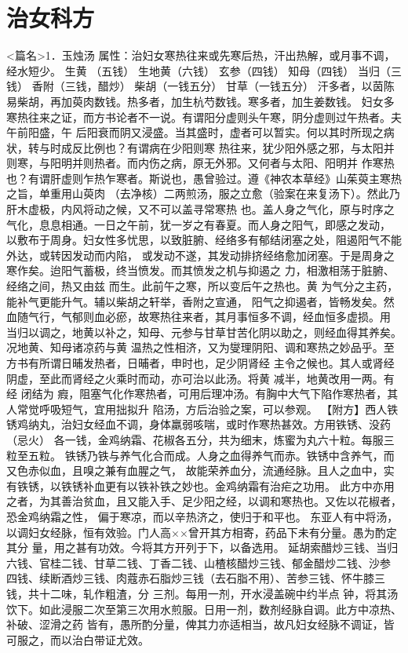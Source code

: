 \documentclass[a4paper,12pt,UTF8,twoside]{ctexbook}
\begin{document}
\chapter{治女科方}
<篇名>1．玉烛汤
属性：治妇女寒热往来或先寒后热，汗出热解，或月事不调，经水短少。 
生黄 （五钱） 生地黄（六钱） 玄参（四钱） 知母（四钱） 当归（三钱） 香附（三钱，醋炒） 
柴胡（一钱五分） 甘草（一钱五分） 
汗多者，以茵陈易柴胡，再加萸肉数钱。热多者，加生杭芍数钱。寒多者，加生姜数钱。 
妇女多寒热往来之证，而方书论者不一说。有谓阳分虚则头午寒，阴分虚则过午热者。夫午前阳盛，午 
后阳衰而阴又浸盛。当其盛时，虚者可以暂实。何以其时所现之病状，转与时成反比例也？有谓病在少阳则寒 
热往来，犹少阳外感之邪，与太阳并则寒，与阳明并则热者。而内伤之病，原无外邪。又何者与太阳、阳明并 
作寒热也？有谓肝虚则乍热乍寒者。斯说也，愚曾验过。遵《神农本草经》山茱萸主寒热之旨，单重用山萸肉 
（去净核）二两煎汤，服之立愈（验案在来复汤下）。然此乃肝木虚极，内风将动之候，又不可以盖寻常寒热 
也。盖人身之气化，原与时序之气化，息息相通。一日之午前，犹一岁之有春夏。而人身之阳气，即感之发动， 
以敷布于周身。妇女性多忧思，以致脏腑、经络多有郁结闭塞之处，阻遏阳气不能外达，或转因发动而内陷， 
或发动不遂，其发动排挤经络愈加闭塞。于是周身之寒作矣。迨阳气蓄极，终当愤发。而其愤发之机与抑遏之 
力，相激相荡于脏腑、经络之间，热又由兹 
而生。此前午之寒，所以变后午之热也。黄 为气分之主药，能补气更能升气。辅以柴胡之轩举，香附之宣通， 
阳气之抑遏者，皆畅发矣。然血随气行，气郁则血必瘀，故寒热往来者，其月事恒多不调，经血恒多虚损。用 
当归以调之，地黄以补之，知母、元参与甘草甘苦化阴以助之，则经血得其养矣。况地黄、知母诸凉药与黄 
温热之性相济，又为燮理阴阳、调和寒热之妙品乎。至方书有所谓日晡发热者，日晡者，申时也，足少阴肾经 
主令之候也。其人或肾经阴虚，至此而肾经之火乘时而动，亦可治以此汤。将黄 减半，地黄改用一两。有经 
闭结为 瘕，阻塞气化作寒热者，可用后理冲汤。有胸中大气下陷作寒热者，其人常觉呼吸短气，宜用拙拟升 
陷汤，方后治验之案，可以参观。 
【附方】西人铁锈鸡纳丸，治妇女经血不调，身体羸弱咳喘，或时作寒热甚效。方用铁锈、没药（忌火） 
各一钱，金鸡纳霜、花椒各五分，共为细末，炼蜜为丸六十粒。每服三粒至五粒。 
铁锈乃铁与养气化合而成。人身之血得养气而赤。铁锈中含养气，而又色赤似血，且嗅之兼有血腥之气， 
故能荣养血分，流通经脉。且人之血中，实有铁锈，以铁锈补血更有以铁补铁之妙也。金鸡纳霜有治疟之功用。 
此方中亦用之者，为其善治贫血，且又能入手、足少阳之经，以调和寒热也。又佐以花椒者，恐金鸡纳霜之性， 
偏于寒凉，而以辛热济之，使归于和平也。 
东亚人有中将汤，以调妇女经脉，恒有效验。门人高××曾开其方相寄，药品下未有分量。愚为酌定其分 
量，用之甚有功效。今将其方开列于下，以备选用。 
延胡索醋炒三钱、当归六钱、官桂二钱、甘草二钱、丁香二钱、山楂核醋炒三钱、郁金醋炒二钱、沙参 
四钱、续断酒炒三钱、肉蔻赤石脂炒三钱（去石脂不用）、苦参三钱、怀牛膝三钱，共十二味，轧作粗渣，分 
三剂。每用一剂，开水浸盖碗中约半点 
钟，将其汤饮下。如此浸服二次至第三次用水煎服。日用一剂，数剂经脉自调。此方中凉热、补破、涩滑之药 
皆有，愚所酌分量，俾其力亦适相当，故凡妇女经脉不调证，皆可服之，而以治白带证尤效。 
\end{document}
